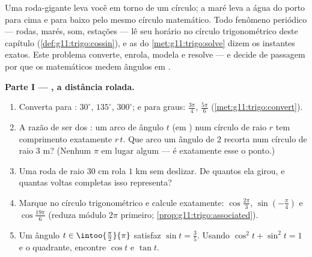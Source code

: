 \begin{problem}
\label{pb:g11:trigo:1}
Uma roda-gigante leva você em torno de um círculo; a maré leva a
água do porto para cima e para baixo pelo mesmo círculo
matemático. Todo fenômeno periódico --- rodas, marés, som,
estações --- lê seu horário no círculo trigonométrico deste
capítulo (\cref{def:g11:trigo:cossin}), e as  do
\cref{met:g11:trigo:solve} dizem os instantes exatos. Este
problema converte, enrola, modela e resolve --- e decide de
passagem por que os matemáticos medem ângulos em .

\medskip
\noindent\textbf{Parte I --- , a distância rolada.}
\begin{enumerate}
  \item Converta para : $30^\circ$, $135^\circ$,
        $300^\circ$; e para graus: $\frac{3\pi}{4}$,
        $\frac{5\pi}{6}$ (\cref{met:g11:trigo:convert}).
  \item A razão de ser dos : um arco de ângulo $t$ (em
        ) num círculo de raio $r$ tem comprimento
        exatamente $r\,t$. Que arco um ângulo de $2$ 
        recorta num círculo de raio $3$ m? (Nenhum $\pi$ em lugar
        algum --- é exatamente esse o ponto.)
  \item Uma roda de raio $30$ cm rola $1$ km sem deslizar. De
        quantos \emph{} ela girou, e quantas voltas
        completas isso representa?
  \item Marque no círculo trigonométrico e calcule exatamente:
        $\cos\frac{2\pi}{3}$, $\sin\left(-\frac{\pi}{4}\right)$ e
        $\cos\frac{19\pi}{6}$ (reduza módulo $2\pi$ primeiro;
        \cref{prop:g11:trigo:associated}).
  \item Um ângulo $t \in \intoo{\frac\pi2}{\pi}$ satisfaz
        $\sin t = \frac35$. Usando $\cos^2 t + \sin^2 t = 1$ e o
        quadrante, encontre $\cos t$ e $\tan t$.
\end{enumerate}


\end{problem}
